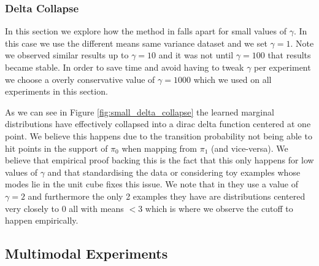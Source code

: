 \documentclass[a4paper,12pt,twoside,openright]{report}
\theoremstyle{definition}
\begin{document}
\subsubsection{Delta Collapse}
In this section we explore how the method in \cite{pavon2018data} falls apart for small values of $\gamma$. In this case we use the different means same variance dataset and we set $\gamma=1$. Note we observed similar results up to $\gamma=10$ and it was not until $\gamma=100$ that results became stable. In order to save time and avoid having to tweak $\gamma$ per experiment we choose a overly conservative value of $\gamma=1000$ which we used on all experiments in this section.

As we can see in Figure \ref{fig:small_delta_collapse} the learned marginal distributions have effectively collapsed into a dirac delta function centered at one point.  We believe this happens due to the transition probability not being able to hit points in the support of $\pi_0$ when mapping from $\pi_1$ (and vice-versa). We believe that empirical proof backing this is the fact that this only happens for low values of $\gamma$ and that standardising the data or considering toy examples whose modes lie in the unit cube fixes this issue. We note that in \cite{pavon2018data} they use a value of $\gamma=2$ and furthermore the only 2 examples they have are distributions centered very closely to 0 all with means $<3$ which is where we observe the cutoff to happen empirically. 
\subsection{Multimodal Experiments}
\end{document}

